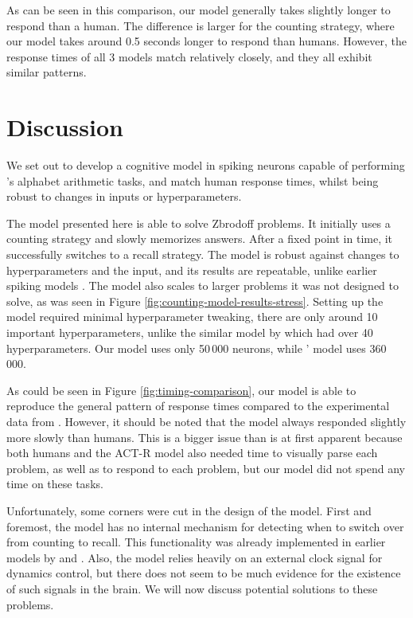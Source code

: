 \documentclass[10pt, a4paper, twocolumn]{article}
\begin{document}
As can be seen in this comparison, our model generally takes slightly longer to respond than a human. The difference is larger for the counting strategy, where our model takes around 0.5 seconds longer to respond than humans. However, the response times of all 3 models match relatively closely, and they all exhibit similar patterns.
	
\section{Discussion}
	
We set out to develop a cognitive model in spiking neurons capable of performing \citeauthor{Zbrodoff1995}'s alphabet arithmetic tasks, and match human response times, whilst being robust to changes in inputs or hyperparameters.
	
The model presented here is able to solve Zbrodoff problems. It initially uses a counting strategy and slowly memorizes answers. After a fixed point in time, it successfully switches to a recall strategy. The model is robust against changes to hyperparameters and the input, and its results are repeatable, unlike earlier spiking models \citep{Praetorius}. The model also scales to larger problems it was not designed to solve, as was seen in Figure \ref{fig:counting-model-results-stress}. Setting up the model required minimal hyperparameter tweaking, there are only around 10 important hyperparameters, unlike the similar model by \cite{Aubin2016} which had over 40 hyperparameters. Our model uses only 50\,000 neurons, while \citeauthor{Praetorius}' model uses 360\,000.

As could be seen in Figure \ref{fig:timing-comparison}, our model is able to reproduce the general pattern of response times compared to the experimental data from \cite{Zbrodoff1995}. However, it should be noted that the model always responded slightly more slowly than humans. This is a bigger issue than is at first apparent because both humans and the ACT-R model also needed time to visually parse each problem, as well as to respond to each problem, but our model did not spend any time on these tasks.

Unfortunately, some corners were cut in the design of the model. First and foremost, the model has no internal mechanism for detecting when to switch over from counting to recall. This functionality was already implemented in earlier models by \cite{Aubin2016} and \cite{Praetorius}. Also, the model relies heavily on an external clock signal for dynamics control, but there does not seem to be much evidence for the existence of such signals in the brain. We will now discuss potential solutions to these problems.
\end{document}
